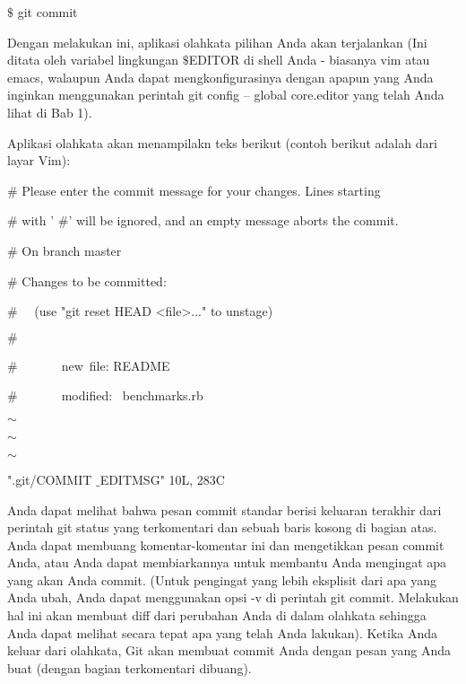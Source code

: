 \vspace{12pt}
\noindent 
 $  \$  $ git commit \par
\noindent 
Dengan melakukan ini, aplikasi olahkata pilihan Anda akan terjalankan (Ini ditata oleh variabel lingkungan  $  \$  $EDITOR di shell Anda - biasanya vim atau emacs, walaupun Anda dapat mengkonfigurasinya dengan apapun yang Anda inginkan menggunakan perintah git config -- global core.editor yang telah Anda lihat di Bab 1). \par
\noindent 
Aplikasi olahkata akan menampilakn teks berikut (contoh berikut adalah dari layar Vim): \par
\vspace{12pt}
\vspace{12pt}
\noindent 
 $  \#  $ Please enter the commit message for your changes. Lines starting \par
\noindent 
 $  \#  $ with ' $  \#  $' will be ignored, and an empty message aborts the commit. \par
\noindent 
 $  \#  $ On branch master \par
\noindent 
 $  \#  $ Changes to be committed: \par
\noindent 
 $  \#  $~~ (use "git reset HEAD <file>..." to unstage) \par
\noindent 
 $  \#  $ \par
\noindent 
 $  \#  $~~~~~~~new~file:   README \par
\noindent 
 $  \#  $~~~~~~~modified:~  benchmarks.rb  \par
\noindent 
 $  \sim  $ \par
\noindent 
 $  \sim  $ \par
\noindent 
 $  \sim  $ \par
\noindent 
".git/COMMIT $  \_  $EDITMSG" 10L, 283C \par
\vspace{12pt}
\vspace{12pt}
\noindent 
Anda dapat melihat bahwa pesan commit standar berisi keluaran terakhir dari perintah git status yang terkomentari dan sebuah baris kosong di bagian atas. Anda dapat membuang komentar-komentar ini dan mengetikkan pesan commit Anda, atau Anda dapat membiarkannya untuk membantu Anda mengingat apa yang akan Anda commit. (Untuk pengingat yang lebih eksplisit dari apa yang Anda ubah, Anda dapat menggunakan opsi -v di perintah git commit. Melakukan hal ini akan membuat diff dari perubahan Anda di dalam olahkata sehingga Anda dapat melihat secara tepat apa yang telah Anda lakukan). Ketika Anda keluar dari olahkata, Git akan membuat commit Anda dengan pesan yang Anda buat (dengan bagian terkomentari dibuang). \par

